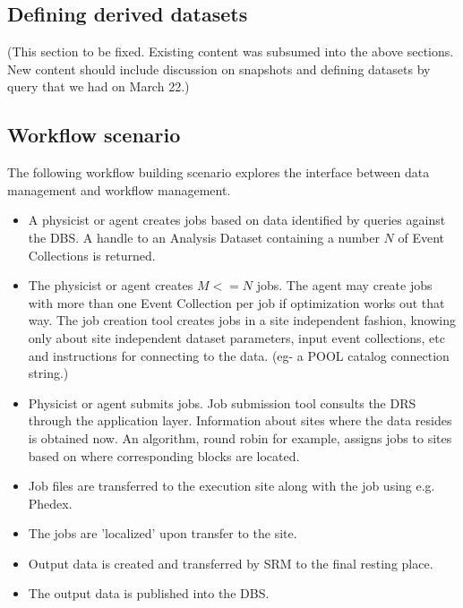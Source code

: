 \documentclass{cmspaper}
\begin{document}
\subsection{Defining derived datasets}

(This section to be fixed. Existing content was subsumed into the above sections.  
New content should include discussion on snapshots and defining datasets by 
query that we had on March 22.) 

 
\subsection{Workflow scenario}

The following workflow building scenario explores the 
interface between data management and workflow management.
\begin{itemize}
\item A physicist or agent creates jobs based on data identified by queries against 
the DBS.  A handle to an Analysis Dataset containing a number $N$ of
Event Collections is returned.  
\item The physicist or agent creates $M <= N$ jobs.  The agent may create jobs with more than 
one Event Collection per job if optimization works out that way.  The job 
creation tool creates jobs in a site independent fashion, knowing only about site 
independent dataset parameters, input event collections, etc and instructions for 
connecting to the data.  (eg- a POOL catalog connection string.)
\item Physicist or agent submits jobs.  Job submission tool consults the DRS through the 
application layer.  Information about sites where the data resides is obtained 
now.  An algorithm, round robin for example, assigns jobs to sites based on where 
corresponding blocks are located.
\item Job files are transferred to the execution site along with the job using e.g. Phedex.
\item The jobs are 'localized' upon transfer to the site.
\item Output data is created and transferred by SRM to the final resting place.
\item The output data is published into the DBS.
\end{itemize}
\end{document}
